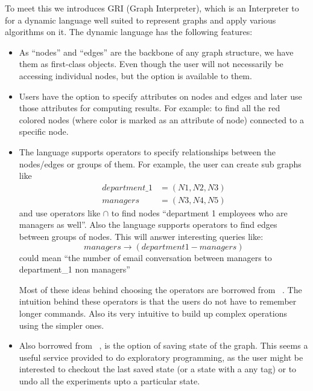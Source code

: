 \documentclass[12,twoside]{article}
\begin{document}
 To meet this we introduces GRI (Graph Interpreter), which is
 an Interpreter to for a dynamic  language well suited to 
 represent graphs and apply various algorithms on it. The dynamic
 language has the following features:

 \begin{itemize}
   \item As ``nodes'' and ``edges'' are the backbone of any graph structure, we have them as 
  first-class objects. Even though the user will not necessarily
  be accessing individual nodes, but the option is available to them.
  \item Users have the option to specify attributes on nodes and edges and later use
  those attributes for computing results. For example: to find all the red colored nodes (where color is marked as an attribute of
      node) connected to a specific node.
  \item The language supports  operators to specify relationships between the nodes/edges or groups of them.
  For example, the user can create sub graphs like
  \begin{align}
          department\_1 &= (N1,N2,N3) \\
          managers &= (N3,N4,N5) 
  \end{align}
  and use operators like $\cap$ to find
  nodes ``department 1 employees who are managers as well''.
  Also the language supports operators to find edges between groups of nodes. 
  This will answer interesting queries like:
  $$managers \rightarrow  (department 1 - managers) $$ could mean
  ``the number of email conversation between managers to department\_1 non managers''

  Most of these ideas
  behind choosing the operators are borrowed from ~\cite{Adar}. 
  The intuition behind these operators is that the users do not have to remember longer 
  commands. Also its very intuitive to build up complex operations using the simpler ones.

   \item Also borrowed from ~\cite{Adar}, is the option of saving state of the graph.
     This seems a useful service provided to do exploratory programming, as the user might be interested to 
     checkout the last saved state  (or a state with a any tag) or to undo all the experiments
     upto a particular state.

  \end{itemize}

\vspace{1 mm}
\end{document}
